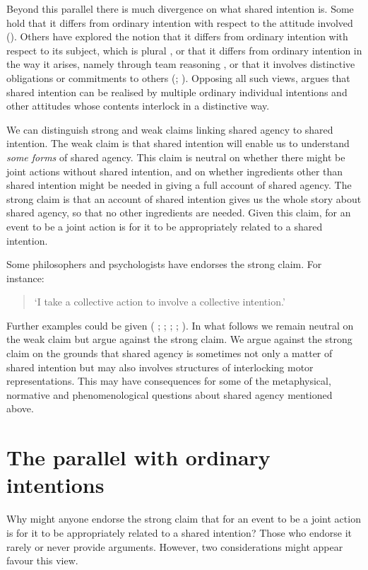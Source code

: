 \documentclass[12pt,\papersize]{extarticle}
\begin{document}
Beyond this parallel there is much divergence on what shared intention is.
Some hold that it differs from
ordinary intention with respect to the attitude involved (\citealp{Searle:1990em}). 
Others have explored the notion that it differs from ordinary intention with respect to its subject, which is plural \citep{Gilbert:1992rs,helm_plural_2008}, 
or that it differs from ordinary intention in the way it arises, namely through team reasoning \citep{Gold:2007zd}, 
or that it involves distinctive obligations or commitments to others (\citealp{Gilbert:1992rs}; \citealp{Roth:2004ki}).
Opposing all such views, \citet{Bratman:1992mi,Bratman:2009lv} argues that shared intention can be realised by multiple ordinary individual intentions and other attitudes whose contents interlock in a distinctive way. 

We can distinguish strong and weak claims linking shared agency to shared intention.
The weak claim is that shared intention will enable us to understand \emph{some forms} of shared agency.
This claim is neutral on whether there might be joint actions without shared intention, and on whether ingredients other than shared intention might be needed in giving a full account of shared agency.
The strong claim is that an account of shared intention gives us the whole story about shared agency, so that no other ingredients are needed.  Given this claim, for an event to be a joint action is for it to be appropriately related to a shared intention.

Some philosophers and psychologists have endorses the strong claim.  For instance:  
%
\begin{quote} 
`I take a collective action to involve a collective intention.'  \citep[p.\ 5]{Gilbert:2006wr}
\end{quote}
%
Further examples could be given  (%
	\citealp[p.\ 381]{Carpenter:2009wq}; 
	\citealp[p.\ 369]{Call:2009fk};
	\citealp{Kutz:2000si}; 
	\citealp[p.\ 117]{rakoczy_pretend_2006}; 
	\citealp{Tollefsen:2005vh}%
	).
In what follows we remain neutral on the weak claim but argue against the strong claim.
We argue against the strong claim on the grounds that shared agency is sometimes not only a matter of shared intention but may also involves structures of interlocking motor representations.
This may have consequences for some of the metaphysical, normative and phenomenological questions about shared agency mentioned above.


\section{The parallel with ordinary intentions}
Why might anyone endorse the strong claim that for an event to be a joint action is for it to be appropriately related to a shared intention? 
Those who endorse it rarely or never provide arguments.
However, two considerations might appear favour this view.
\end{document}
